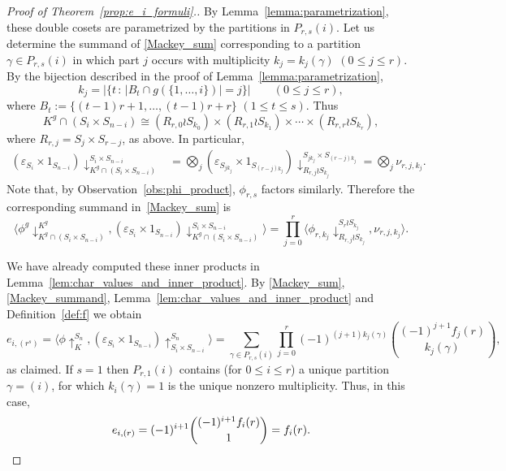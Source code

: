 \documentclass[ALCO,published]{cedram}
\newcommand{\card}[1]{\ensuremath{\left|#1\right|}}
\begin{document}
\begin{proof}[Proof of  Theorem~\ref{prop:e_i_formuli}.]
    By Lemma~\ref{lemma:parametrization}, 
    these double cosets are parametrized by the partitions in $P_{r,s}(i)$.  Let us determine the summand of \eqref{Mackey_sum} 
    corresponding to a partition $\gamma\in P_{r,s}(i)$ in which part $j$ occurs with multiplicity $k_j = k_j(\gamma)$ $(0 \le j \le r)$. 
    By the bijection described in the proof of Lemma~\ref{lemma:parametrization}, 
    \[
        k_j = \card{\{t \,:\, \card{B_t \cap g(\{1, \ldots, i\})} = j\}}
        \qquad (0 \le j \le r),
    \]
    where $B_t := \{(t-1)r+1,\ldots,(t-1)r+r\}$ $(1 \le t \le s)$. Thus
    \[
        K^g \cap (S_i \times S_{n-i})
        \cong (R_{r,0} \wr S_{k_0}) \times (R_{r,1} \wr S_{k_1}) \times \cdots \times (R_{r,r}\wr S_{k_r}),
    \]
    where $R_{r,j} = S_j \times S_{r-j}$, as above. In particular,
    \begin{align*}
        (\varepsilon_{S_i} \times 1_{S_{n-i}})\downarrow^{S_i \times S_{n-i}}_{K^g \cap (S_i \times S_{n-i})}
        &= \bigotimes_j (\varepsilon_{S_{jk_j}} \times 1_{S_{(r-j)k_j}})\downarrow^{S_{jk_j} \times S_{(r-j)k_j}}_{R_{r,j}\wr S_{k_j}}
        = \bigotimes_j \nu_{r,j,k_j}.
    \end{align*}
    Note that, by Observation~\ref{obs:phi_product}, $\phi_{r,s}$ factors similarly.
    Therefore the corresponding summand in~\eqref{Mackey_sum} is
    \begin{equation}\label{Mackey_summand}
        \langle \phi^g\downarrow^{K^g}_{K^g \cap (S_i \times S_{n-i})},
        (\varepsilon_{S_i} \times 1_{S_{n-i}})\downarrow^{S_i \times S_{n-i}}_{K^g \cap (S_i \times S_{n-i})} \rangle 
        = \prod_{j=0}^{r} \langle \phi_{r,k_j}\downarrow^{S_r\wr S_{k_j}}_{R_{r,j}\wr S_{k_j}}, \nu_{r,j,k_j} \rangle.
    \end{equation}
		
    We have already computed these inner products in Lemma~\ref{lem:char_values_and_inner_product}.
    By \eqref{Mackey_sum}, \eqref{Mackey_summand}, Lemma~\ref{lem:char_values_and_inner_product}
    and Definition~\ref{def:f} we obtain
    \[
        e_{i,(r^s)} 
        = \langle \phi\uparrow_K^{S_n}, (\varepsilon_{S_i} \times 1_{S_{n-i}})\uparrow_{S_i \times S_{n-i}}^{S_n} \rangle
        = \sum_{\gamma\in P_{r,s}(i)} \prod_{j=0}^{r} 
        (-1)^{(j+1)k_j(\gamma)} \binom{(-1)^{j+1} f_j(r)}{k_j(\gamma)},
    \]
    as claimed.
    If $s=1$ then $P_{r,1}(i)$ contains (for $0 \le i \le r$) 
    a unique partition $\gamma = (i)$, for which $k_i(\gamma) = 1$ is the unique nonzero multiplicity. Thus, in this case,  
    \[
        e_{i,(r)} 
        = (-1)^{i+1} \binom{(-1)^{i+1}f_i(r)}{1} 
        = f_i(r).
        \qedhere
    \]
\end{proof}
 
\end{document}
